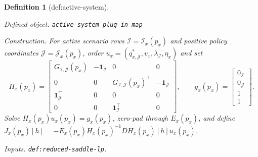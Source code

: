 \documentclass{article}
\newtheorem{definition}{Definition}
\begin{document}
\begin{definition}[def:active-system]\label{def:active-system}
\par\smallskip\noindent\emph{Defined object.} \texttt{active-\allowbreak{}system plug-\allowbreak{}in map}
\par\smallskip\noindent\emph{Construction.} For active scenario rows \(\mathcal I=\mathcal I_x(p_x)\) and positive policy coordinates \(\mathcal J=\mathcal J_x(p_x)\), order \(u_x=(q_{x,\mathcal J}^*,v_x,\lambda_{\mathcal I},\eta_x)\) and set \[H_x(p_x)=\begin{bmatrix}G_{\mathcal I,\mathcal J}(p_x)&-\mathbf 1_{\mathcal I}&0&0\\0&0&G_{\mathcal I,\mathcal J}(p_x)^\top&-\mathbf 1_{\mathcal J}\\\mathbf 1_{\mathcal J}^\top&0&0&0\\0&0&\mathbf 1_{\mathcal I}^\top&0\end{bmatrix},\qquad g_x(p_x)=\begin{bmatrix}0_{\mathcal I}\\0_{\mathcal J}\\1\\1\end{bmatrix}.\] Solve \(H_x(p_x)u_x(p_x)=g_x(p_x)\), zero-pad through \(E_x(p_x)\), and define \(J_x(p_x)[h]=-E_x(p_x)H_x(p_x)^{-1}DH_x(p_x)[h]u_x(p_x)\).
\par\smallskip\noindent\emph{Inputs.} \texttt{def:\allowbreak{}reduced-\allowbreak{}saddle-\allowbreak{}lp}.
\end{definition}
\end{document}
